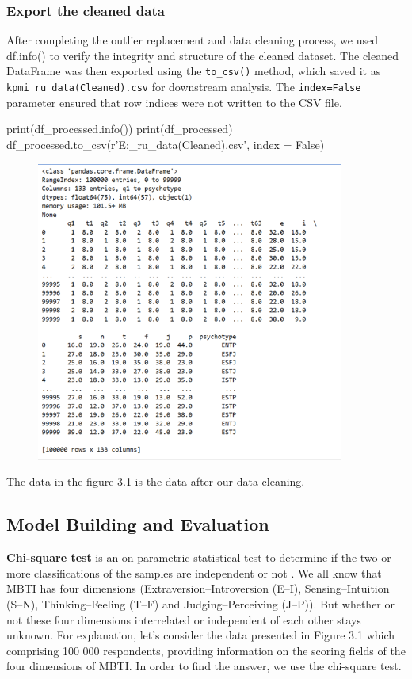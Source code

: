 \documentclass[12pt]{article}
\numberwithin{figure}{section}  %
\begin{document}
	\subsubsection{Export the cleaned data}
	After completing the outlier replacement and data cleaning process, we used
	df.info() to verify the integrity and structure of the cleaned dataset. The
	cleaned DataFrame was then exported using the \texttt{to\_csv()} method, which saved
	it as \texttt{kpmi\_ru\_data(Cleaned).csv} for downstream analysis. The \texttt{index=False}
	parameter ensured that row indices were not written to the CSV file.
	\begin{python}
print(df_processed.info())
print(df_processed)                                                                                              
df_processed.to_csv(r'E:\python\kpmi_ru_data(Cleaned).csv', index = False) 
	\end{python}
	\begin{figure}[H]
		\centering
		\includegraphics[width=0.9\textwidth]{Q1P7}
		
	\end{figure}
	The data in the figure 3.1 is the data after our data cleaning.
	
	\subsection{Model Building and Evaluation}
	\textbf{Chi-square test} is an on parametric statistical test to determine if the two
	or more classifications of the samples are independent or
	not \cite{zibran2007chi}. We all know that MBTI has four
	dimensions (Extraversion–Introversion (E–I), Sensing–Intuition (S–N),
	Thinking–Feeling (T–F) and Judging–Perceiving (J–P)). But whether or not
	these four dimensions interrelated or independent of each other stays
	unknown. For explanation, let’s consider the data presented in Figure 3.1 %
	which comprising 100 000 respondents, providing information on the scoring
	fields of the four dimensions of MBTI. In order to find the answer, we use
	the chi-square test.
	
\end{document}
